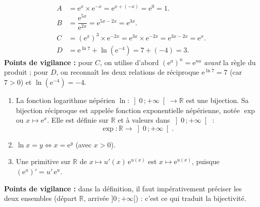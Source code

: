 \documentclass[11pt]{article}
\newcommand{\cle}[1]{{\popxbold\color{popdark}#1}}
\begin{document}
\begin{corrige}
\begin{align*}
A &= \mathrm{e}^{x}\times\mathrm{e}^{-x} = \mathrm{e}^{x+(-x)} = \mathrm{e}^{0} = 1. \\[0.3em]
B &= \dfrac{\mathrm{e}^{5x}}{\mathrm{e}^{2x}} = \mathrm{e}^{5x-2x} = \mathrm{e}^{3x}. \\[0.3em]
C &= \left(\mathrm{e}^{x}\right)^{3}\times\mathrm{e}^{-2x} = \mathrm{e}^{3x}\times\mathrm{e}^{-2x} = \mathrm{e}^{3x-2x} = \mathrm{e}^{x}. \\[0.3em]
D &= \mathrm{e}^{\ln 7} + \ln\left(\mathrm{e}^{-4}\right) = 7 + (-4) = 3.
\end{align*}
\textbf{Points de vigilance :} pour $C$, on utilise d'abord $\left(\mathrm{e}^{a}\right)^{n} = \mathrm{e}^{na}$ \emph{avant} la règle du produit ; pour $D$, on reconnaît les deux relations de réciproque $\mathrm{e}^{\ln 7} = 7$ (car $7>0$) et $\ln(\mathrm{e}^{-4}) = -4$.
\end{corrige}

\begin{corrige}
\begin{enumerate}
\item La fonction logarithme népérien $\ln : \left]0\,;+\infty\right[ \to \mathbb{R}$ est une bijection. Sa bijection réciproque est appelée \cle{fonction exponentielle népérienne}, notée $\exp$ ou $x \mapsto \mathrm{e}^{x}$. Elle est définie sur $\mathbb{R}$ et à valeurs dans $\left]0\,;+\infty\right[$ :
\[ \exp : \mathbb{R} \longrightarrow \left]0\,;+\infty\right[. \]
\item $\ln x = y \iff x = \mathrm{e}^{y}$ (avec $x > 0$).
\item Une primitive sur $\mathbb{R}$ de $x \longmapsto u'(x)\,\mathrm{e}^{u(x)}$ est $x \longmapsto \mathrm{e}^{u(x)}$, puisque $\left(\mathrm{e}^{u}\right)' = u'\,\mathrm{e}^{u}$.
\end{enumerate}
\textbf{Points de vigilance :} dans la définition, il faut impérativement préciser les deux ensembles (départ $\mathbb{R}$, arrivée $]0\,;+\infty[$) : c'est ce qui traduit la bijectivité.
\end{corrige}
\end{document}

